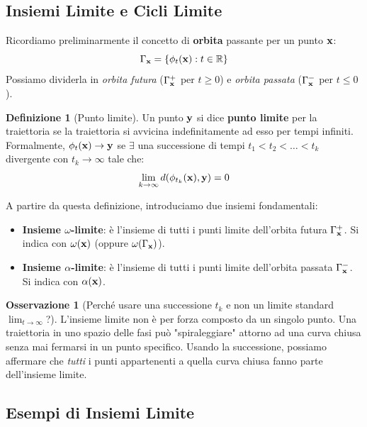 \documentclass[openany]{book}
\theoremstyle{definition}
\newtheorem*{definizione}{Definizione}
\newtheorem*{osservazione}{Osservazione}
\theoremstyle{remark}
\newcommand{\R}{\mathbb{R}}
\begin{document}
\subsection{Insiemi Limite e Cicli Limite}

Ricordiamo preliminarmente il concetto di \textbf{orbita} passante per un punto $\vb{x}$:
\begin{equation}
    \Gamma_{\vb{x}} = \{ \phi_t(\vb{x}) : t \in \R \}
\end{equation}
Possiamo dividerla in \textit{orbita futura} ($\Gamma_{\vb{x}}^+$ per $t \ge 0$) e \textit{orbita passata} ($\Gamma_{\vb{x}}^-$ per $t \le 0$).

\begin{definizione}[Punto limite]
Un punto $\vb{y}$ si dice \textbf{punto limite} per la traiettoria se la traiettoria si avvicina indefinitamente ad esso per tempi infiniti. Formalmente, $\phi_t(\vb{x}) \to \vb{y}$ se $\exists$ una successione di tempi $t_1 < t_2 < \dots < t_k$ divergente con $t_k \to \infty$ tale che:
\begin{equation}
    \lim_{k \to \infty} d(\phi_{t_k}(\vb{x}), \vb{y}) = 0
\end{equation}
\end{definizione}

A partire da questa definizione, introduciamo due insiemi fondamentali:
\begin{itemize}
    \item \textbf{Insieme $\omega$-limite}: è l'insieme di tutti i punti limite dell'orbita futura $\Gamma_{\vb{x}}^+$. Si indica con $\omega(\vb{x})$ (oppure $\omega(\Gamma_{\vb{x}})$).
    \item \textbf{Insieme $\alpha$-limite}: è l'insieme di tutti i punti limite dell'orbita passata $\Gamma_{\vb{x}}^-$. Si indica con $\alpha(\vb{x})$.
\end{itemize}

\begin{osservazione}[Perché usare una successione $t_k$ e non un limite standard $\lim_{t \to \infty}$?]
L'insieme limite non è per forza composto da un singolo punto. Una traiettoria in uno spazio delle fasi può "spiraleggiare" attorno ad una curva chiusa senza mai fermarsi in un punto specifico. Usando la successione, possiamo affermare che \textit{tutti} i punti appartenenti a quella curva chiusa fanno parte dell'insieme limite.
\end{osservazione}



\subsection*{Esempi di Insiemi Limite}
\end{document}
